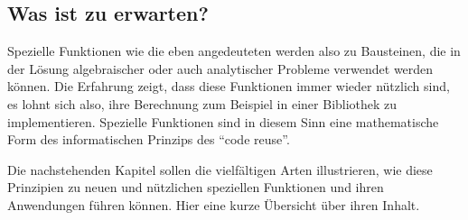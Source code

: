 %
%
\subsection*{Was ist zu erwarten?}
Spezielle Funktionen wie die eben angedeuteten werden also zu
Bausteinen, die in der Lösung algebraischer oder auch analytischer
Probleme verwendet werden können.
Die Erfahrung zeigt, dass diese Funktionen immer wieder nützlich
sind, es lohnt sich also, ihre Berechnung zum Beispiel in einer
Bibliothek zu implementieren.
Spezielle Funktionen sind in diesem Sinn eine mathematische Form
des informatischen Prinzips des ``code reuse''.

Die nachstehenden Kapitel sollen die vielfältigen Arten illustrieren,
wie diese Prinzipien zu neuen und nützlichen speziellen Funktionen
und ihren Anwendungen führen können.
Hier eine kurze Übersicht über ihren Inhalt.

